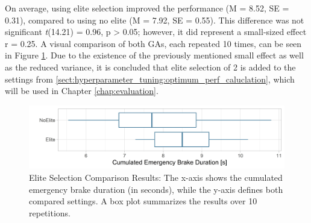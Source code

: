 On average, using elite selection improved the performance (M = 8.52, SE = 0.31), compared to using no elite (M = 7.92, SE = 0.55). This difference was not significant \textit{t}(14.21) = 0.96, p > 0.05; however, it did represent a small-sized effect r = 0.25. A visual comparison of both GAs, each repeated 10 times, can be seen in Figure \ref{fig:hyperparameter_tuning:elite_comparison}. Due to the existence of the previously mentioned small effect as well as the reduced variance, it is concluded that elite selection of 2 is added to the settings from \ref{sect:hyperparameter_tuning:optimum_perf_caluclation}, which will be used in Chapter \ref{chap:evaluation}.

\begin{figure}[ht] 
	\includegraphics[width=1\linewidth]{simulations/evaluation/plots/elite_vs_no_elite}
	\caption{Elite Selection Comparison Results: The x-axis shows the cumulated emergency brake duration (in seconds), while the y-axis defines both compared settings. A box plot summarizes the results over 10 repetitions.}
	\label{fig:hyperparameter_tuning:elite_comparison}
\end{figure}






